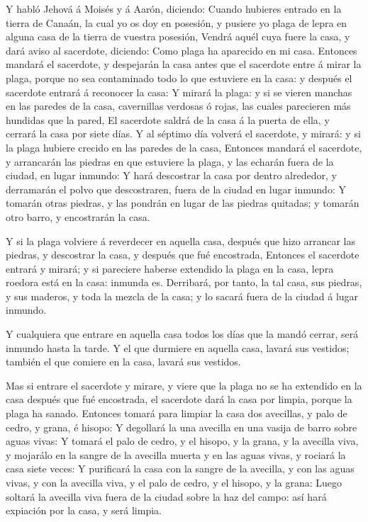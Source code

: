  Y habló Jehová á Moisés y á Aarón, diciendo: 
Cuando hubieres entrado en la tierra de Canaán, la cual yo os doy en
posesión, y pusiere yo plaga de lepra en alguna casa de la tierra de
vuestra posesión,  Vendrá aquél cuya fuere la casa, y dará
aviso al sacerdote, diciendo: Como plaga ha aparecido en mi casa.
 Entonces mandará el sacerdote, y despejarán la casa antes
que el sacerdote entre á mirar la plaga, porque no sea contaminado todo
lo que estuviere en la casa: y después el sacerdote entrará á reconocer
la casa:  Y mirará la plaga: y si se vieren manchas en las
paredes de la casa, cavernillas verdosas ó rojas, las cuales parecieren
más hundidas que la pared,  El sacerdote saldrá de la casa
á la puerta de ella, y cerrará la casa por siete días.  Y
al séptimo día volverá el sacerdote, y mirará: y si la plaga hubiere
crecido en las paredes de la casa,  Entonces mandará el
sacerdote, y arrancarán las piedras en que estuviere la plaga, y las
echarán fuera de la ciudad, en lugar inmundo:  Y hará
descostrar la casa por dentro alrededor, y derramarán el polvo que
descostraren, fuera de la ciudad en lugar inmundo:  Y
tomarán otras piedras, y las pondrán en lugar de las piedras quitadas; y
tomarán otro barro, y encostrarán la casa.

 Y si la plaga volviere á reverdecer en aquella casa,
después que hizo arrancar las piedras, y descostrar la casa, y después
que fué encostrada,  Entonces el sacerdote entrará y
mirará; y si pareciere haberse extendido la plaga en la casa, lepra
roedora está en la casa: inmunda es.  Derribará, por tanto,
la tal casa, sus piedras, y sus maderos, y toda la mezcla de la casa; y
lo sacará fuera de la ciudad á lugar inmundo.

 Y cualquiera que entrare en aquella casa todos los días
que la mandó cerrar, será inmundo hasta la tarde.  Y el que
durmiere en aquella casa, lavará sus vestidos; también el que comiere en
la casa, lavará sus vestidos.

 Mas si entrare el sacerdote y mirare, y viere que la plaga
no se ha extendido en la casa después que fué encostrada, el sacerdote
dará la casa por limpia, porque la plaga ha sanado. 
Entonces tomará para limpiar la casa dos avecillas, y palo de cedro, y
grana, é hisopo:  Y degollará la una avecilla en una vasija
de barro sobre aguas vivas:  Y tomará el palo de cedro, y
el hisopo, y la grana, y la avecilla viva, y mojarálo en la sangre de la
avecilla muerta y en las aguas vivas, y rociará la casa siete veces:
 Y purificará la casa con la sangre de la avecilla, y con
las aguas vivas, y con la avecilla viva, y el palo de cedro, y el
hisopo, y la grana:  Luego soltará la avecilla viva fuera
de la ciudad sobre la haz del campo: así hará expiación por la casa, y
será limpia.

